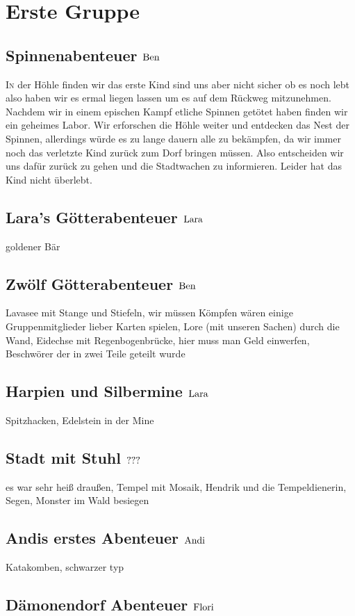 \chapter{Erste Gruppe}
\section{Spinnenabenteuer \hfill $\rm{Ben}$}
\lettrine{I}{n} der H\"ohle finden wir das erste Kind sind uns aber nicht sicher ob es noch lebt also haben wir es ermal liegen lassen um es auf dem R\"uckweg mitzunehmen. Nachdem wir in einem epischen Kampf etliche Spinnen get\"otet haben finden wir ein geheimes Labor. Wir erforschen die H\"ohle weiter und entdecken das Nest der Spinnen, allerdings w\"urde es zu lange dauern alle zu bek\"ampfen, da wir immer noch das verletzte Kind zur\"uck zum Dorf bringen m\"ussen. Also entscheiden wir uns daf\"ur zur\"uck zu gehen und die Stadtwachen zu informieren. Leider hat das Kind nicht \"uberlebt.

\section{Lara's G\"otterabenteuer \hfill $\rm{Lara}$}
goldener Bär
\section{Zw\"olf G\"otterabenteuer \hfill $\rm{Ben}$}
Lavasee mit Stange und Stiefeln, wir müssen Kömpfen wären einige Gruppenmitglieder lieber Karten spielen, Lore (mit unseren Sachen) durch die Wand, Eidechse mit Regenbogenbr\"ucke, hier muss man Geld einwerfen, Beschwörer der in zwei Teile geteilt wurde
\section{Harpien und Silbermine \hfill $\rm{Lara}$}
Spitzhacken, Edelstein in der Mine
\section{Stadt mit Stuhl \hfill $\rm{???}$}
es war sehr heiß draußen, Tempel mit Mosaik, Hendrik und die Tempeldienerin, Segen, Monster im Wald besiegen
\section{Andis erstes Abenteuer \hfill $\rm{Andi}$}
Katakomben, schwarzer typ
\section{D\"amonendorf Abenteuer \hfill $\rm{Flori}$}
